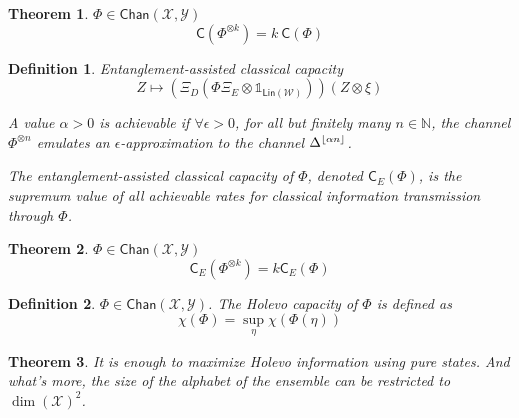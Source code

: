 \documentclass[aps,pra,onecolumn,notitlepage,superscriptaddress]{revtex4-1}
\DeclarePairedDelimiter{\floor}{\lfloor}{\rfloor}
\newcommand{\N}{\mathbb{N}}
\newcommand{\spc}[1]{\mathcal{#1}}
\newcommand{\Lin}{\mathsf{Lin}}
\newcommand{\ca}{\mathsf{C}}
\newcommand{\Chan}{{\mathsf{Chan}}}
\newcommand\I{\mathds{1}}
\newtheorem{theo}{Theorem}
\newtheorem{defi}{Definition}
\begin{document}
    \begin{theo}
        $\Phi \in \Chan(\spc X, \spc Y)$
        \begin{equation}
            \ca(\Phi^{\otimes k}) = k \ \ca (\Phi)
        \end{equation}
    \end{theo}

    \begin{defi}
        Entanglement-assisted classical capacity
        \begin{equation}
            Z \mapsto (\Xi_D ( \Phi \Xi_E \otimes \I_{\Lin(\spc W)} ) ) (Z \otimes \xi)
        \end{equation}

        A value $\alpha > 0$ is achievable if $\forall \epsilon > 0$, for all but finitely many $n \in \N$, the channel $\Phi^{\otimes n}$ emulates an $\epsilon$-approximation to the channel $\Delta^{\floor {\alpha n}}$.

        The entanglement-assisted classical capacity of $\Phi$, denoted $\ca_E(\Phi)$, is the supremum value of all achievable rates for classical information transmission through $\Phi$.
    \end{defi}

    \begin{theo}
        $\Phi \in \Chan(\spc X, \spc Y)$
        \begin{equation}
            \ca_E(\Phi^{\otimes k}) = k \ca_E (\Phi)
        \end{equation}
    \end{theo}

    \begin{defi}
        $\Phi \in \Chan(\spc X, \spc Y)$. The Holevo capacity of $\Phi$ is defined as
        \begin{equation}
            \chi(\Phi) = \sup_{\eta} \chi(\Phi(\eta))
        \end{equation}
    \end{defi}

    \begin{theo}
        It is enough to maximize Holevo information using pure states. And what's more, the size of the alphabet of the ensemble can be restricted to $\dim(\spc X)^2$.
    \end{theo}
    
\end{document}
